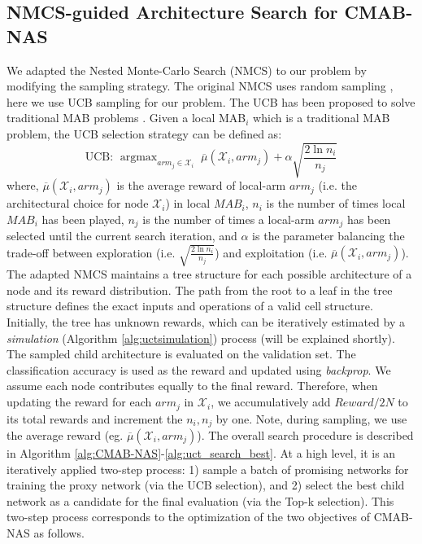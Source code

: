 \documentclass[conference]{IEEEtran}
\def \X {\mathcal{X}}
\DeclareMathOperator*{\argmax}{argmax}
\begin{document}
\subsection{NMCS-guided Architecture Search for CMAB-NAS}
\label{sec:uct}
We adapted the Nested Monte-Carlo Search (NMCS) to our problem by modifying the sampling strategy. The original NMCS uses random sampling \cite{cazenave2009nested}, here we use UCB sampling for our problem. The UCB has been proposed to solve traditional MAB problems \cite{kocsis2006bandit}. Given a local MAB$_i$ which is a traditional MAB problem, the UCB selection strategy can be defined as:
\begin{equation} \label{ucb}
\text{UCB: } \argmax_{arm_{j} \in \X_{i}} \; \overline{\mu}(\X_{i}, arm_j) + \alpha\sqrt{\frac{2 \ln n_i}{n_j}}
\end{equation}
where, $\overline{\mu}(\X_{i}, arm_j)$ is the average reward of local-arm $arm_j$ (i.e. the architectural choice for node $\X_{i}$) in local $MAB_i$, 
$n_i$ is the number of times local $MAB_i$ has been played,
$n_j$ is the number of times a local-arm $arm_j$ has been selected until the current search iteration, and $\alpha$ is the parameter balancing the trade-off between exploration (i.e. $\sqrt{\frac{2 \ln n_i}{n_j}}$) and exploitation (i.e. $\overline{\mu}(\X_{i}, arm_{j})$).
The adapted NMCS maintains a tree structure for each possible architecture of a node and its reward distribution. The path from the root to a leaf in the tree structure defines the exact inputs and operations of a valid cell structure. Initially, the tree has unknown rewards, which can be iteratively estimated by a \emph{simulation} (Algorithm \ref{alg:uctsimulation}) process (will be explained shortly).
The sampled child architecture is evaluated on the validation set. The classification accuracy is used as the reward and updated using \emph{backprop}. We assume each node contributes equally to the final reward. Therefore, when updating the reward for each $arm_j$ in $\X_{i}$, we accumulatively add $Reward / 2N$ to its total rewards and increment the $n_i, n_j$ by one. 
Note, during sampling, we use the average reward (eg. $\overline{\mu}(\X_{i}, arm_{j})$).
The overall search procedure is described in Algorithm \ref{alg:CMAB-NAS}-\ref{alg:uct_search_best}. 
At a high level, it is an iteratively applied two-step process: 1) sample a batch of promising networks for training the proxy network (via the UCB selection), and 2) select the best child network as a candidate for the final evaluation (via the Top-k selection). 
This two-step process corresponds to the optimization of the two objectives of CMAB-NAS as follows.
\end{document}

